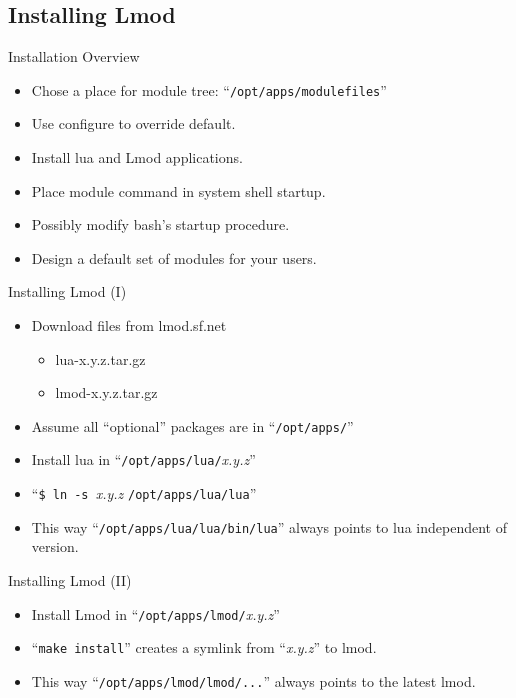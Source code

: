 \documentclass{beamer}
\begin{document}
\subsection{Installing Lmod}
\label{sec:installing}

\begin{frame}{Installation Overview}
  \begin{itemize}
    \item Chose a place for module tree: ``\texttt{/opt/apps/modulefiles}''
    \item Use configure to override default.
    \item Install lua and Lmod applications.
    \item Place module command in system shell startup.
    \item Possibly modify bash's startup procedure.
    \item Design a default set of modules for your users.
  \end{itemize}
\end{frame}


\begin{frame}{Installing Lmod (I)}
  \begin{itemize}
    \item Download files from lmod.sf.net
      \begin{itemize}
        \item lua-x.y.z.tar.gz
        \item lmod-x.y.z.tar.gz
      \end{itemize}
    \item Assume all ``optional'' packages are in ``\texttt{/opt/apps/}''
    \item Install lua in ``\texttt{/opt/apps/lua/}\emph{x.y.z}''
    \item ``\texttt{\$ ln -s }\emph{x.y.z} \texttt{/opt/apps/lua/lua}''
    \item This way ``\texttt{/opt/apps/lua/lua/bin/lua}'' always points to
      lua independent of version.
  \end{itemize}
\end{frame}

\begin{frame}{Installing Lmod (II)}
  \begin{itemize}
    \item Install Lmod in ``\texttt{/opt/apps/lmod/}\emph{x.y.z}''
    \item ``\texttt{make install}'' creates a symlink from
      ``\emph{x.y.z}'' to lmod.
    \item This way ``\texttt{/opt/apps/lmod/lmod/...}'' always points
      to the latest lmod.
  \end{itemize}
\end{frame}
\end{document}
